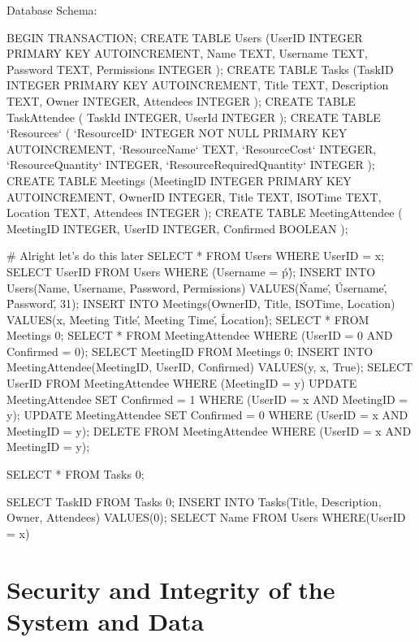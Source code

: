     Database Schema:
\begin{sql}
    BEGIN TRANSACTION;
CREATE TABLE Users
                (UserID INTEGER PRIMARY KEY AUTOINCREMENT,
                Name TEXT,
                Username TEXT,
                Password TEXT,
                Permissions INTEGER
                );
CREATE TABLE Tasks
                (TaskID INTEGER PRIMARY KEY AUTOINCREMENT,
                Title TEXT,
                Description TEXT,
                Owner INTEGER,
                Attendees INTEGER
                );
CREATE TABLE TaskAttendee
                (
                TaskId INTEGER,
                UserId INTEGER
                );
CREATE TABLE `Resources` (
	`ResourceID`	INTEGER NOT NULL PRIMARY KEY AUTOINCREMENT,
	`ResourceName`	TEXT,
	`ResourceCost`	INTEGER,
	`ResourceQuantity`	INTEGER,
	`ResourceRequiredQuantity`	INTEGER
);
CREATE TABLE Meetings
                (MeetingID INTEGER PRIMARY KEY AUTOINCREMENT,
                OwnerID INTEGER,
                Title TEXT,
                ISOTime TEXT,
                Location TEXT,
                Attendees INTEGER
                );
CREATE TABLE MeetingAttendee
(
    MeetingID INTEGER,
    UserID INTEGER,
    Confirmed BOOLEAN
);


# Alright let's do this later
SELECT * FROM Users WHERE UserID = x;
SELECT UserID FROM Users WHERE (Username = \'p\');
INSERT INTO Users(Name, Username, Password, Permissions) VALUES(\'Name\', \'Username\', \'Password\', 31);
INSERT INTO Meetings(OwnerID, Title, ISOTime, Location) VALUES(x, \'Meeting Title\', \'Meeting Time\',  \'Location\');
SELECT * FROM Meetings {0};
SELECT * FROM MeetingAttendee WHERE (UserID = {0} AND Confirmed = 0);
SELECT MeetingID FROM Meetings {0};
INSERT INTO MeetingAttendee(MeetingID, UserID, Confirmed) VALUES(y, x, True);
SELECT UserID FROM MeetingAttendee WHERE (MeetingID = y)
UPDATE MeetingAttendee SET Confirmed = 1 WHERE (UserID = x AND MeetingID = y);
UPDATE MeetingAttendee SET Confirmed = 0 WHERE (UserID = x AND MeetingID = y);
DELETE FROM MeetingAttendee WHERE (UserID = x AND MeetingID = y);

SELECT * FROM Tasks {0};

SELECT TaskID FROM Tasks {0};
INSERT INTO Tasks(Title, Description, Owner, Attendees) VALUES({0});
SELECT Name FROM Users WHERE(UserID = x)

\end{sql}


\section{Security and Integrity of the System and Data}

